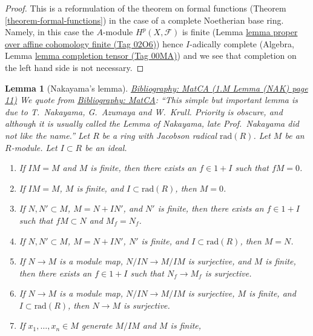 \documentclass{amsart}
\newenvironment{reference}{\comment}{\endcomment}
\newenvironment{history}{\comment}{\endcomment}
\theoremstyle{plain}
\newtheorem{lemma}[subsection]{Lemma}
\theoremstyle{definition}
\theoremstyle{remark}
\numberwithin{equation}{subsection}
\begin{document}
\begin{proof}
This is a reformulation of the theorem on formal functions
(Theorem \ref{theorem-formal-functions}) in the
case of a complete Noetherian base ring. Namely, in this case the
$A$-module $H^p(X, \mathcal{F})$ is finite
(Lemma \href{https://stacks.math.columbia.edu/tag/02O6}{lemma proper over affine cohomology finite (Tag 02O6)}) hence
$I$-adically complete (Algebra, Lemma \href{https://stacks.math.columbia.edu/tag/00MA}{lemma completion tensor (Tag 00MA)})
and we see that completion on the left hand side is not necessary.
\end{proof}


\begin{lemma}[Nakayama's lemma]
\label{algebra-lemma-NAK}
\begin{reference}
\href{https://stacks.math.columbia.edu/bibliography}{Bibliography: MatCA (1.M Lemma (NAK) page 11)}
\end{reference}
\begin{history}
We quote from \href{https://stacks.math.columbia.edu/bibliography}{Bibliography: MatCA}: ``This simple but
important lemma is due to T.~Nakayama, G.~Azumaya and W.~Krull. Priority
is obscure, and although it is usually called the Lemma of Nakayama, late
Prof.~Nakayama did not like the name.''
\end{history}
Let $R$ be a ring with Jacobson radical $\text{rad}(R)$.
Let $M$ be an $R$-module. Let $I \subset R$
be an ideal.
\begin{enumerate}
\item
\label{algebra-item-nakayama}
If $IM = M$ and $M$ is finite, then there exists an $f \in 1 + I$ such that
$fM = 0$.
\item If $IM = M$, $M$ is finite, and $I \subset \text{rad}(R)$, then $M = 0$.
\item If $N, N' \subset M$, $M = N + IN'$, and $N'$ is finite,
then there exists an $f \in 1 + I$ such that $fM \subset N$ and $M_f = N_f$.
\item If $N, N' \subset M$, $M = N + IN'$, $N'$ is finite, and
$I \subset \text{rad}(R)$, then $M = N$.
\item If $N \to M$ is a module map, $N/IN \to M/IM$ is
surjective, and $M$ is finite, then there exists an $f \in 1 + I$
such that $N_f \to M_f$ is surjective.
\item If $N \to M$ is a module map, $N/IN \to M/IM$ is
surjective, $M$ is finite, and $I \subset \text{rad}(R)$,
then $N \to M$ is surjective.
\item If $x_1, \ldots, x_n \in M$ generate $M/IM$ and $M$ is finite,

\end{enumerate}
\end{lemma}
\end{document}
